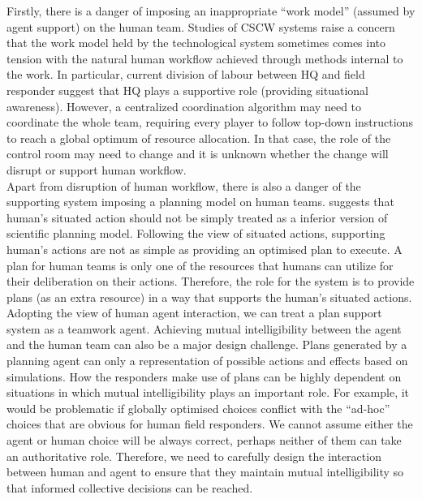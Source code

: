 Firstly, there is a danger of imposing an inappropriate ``work model'' (assumed by agent support) on the human team. Studies of \ac{CSCW} systems \citep{Bowers1994} raise a concern that the work model held by the technological system sometimes comes into tension with the natural human workflow achieved through methods internal to the work. In particular, current division of labour between HQ and field responder suggest that HQ plays a supportive role (providing situational awareness). However, a centralized coordination algorithm may need to coordinate the whole team, requiring every player to follow top-down instructions to reach a global optimum of resource allocation. In that case, the role of the control room may need to change and it is unknown whether the change will disrupt or support human workflow. \\

Apart from disruption of human workflow, there is also a danger of the supporting system imposing a planning model on human teams. \cite{Suchman1987} suggests that human's situated action should not be simply treated as a inferior version of scientific planning model. Following the view of situated actions, supporting human's actions are not as simple as providing an optimised plan to execute. A plan for human teams is only one of the resources that humans can utilize for their deliberation on their actions. Therefore, the role for the system is to provide plans (as an extra resource) in a way that supports the human's situated actions. \\

Adopting the view of human agent interaction, we can treat a plan support system as a teamwork agent.  Achieving mutual intelligibility between the agent and the human team can also be a major design challenge. Plans generated by a planning agent can only a representation of possible actions and effects based on simulations. How the responders make use of plans can be highly dependent on situations in which mutual intelligibility plays an important role. For example, it would be problematic if globally optimised choices conflict with the ``ad-hoc'' choices that are obvious for human field responders. We cannot assume either the agent or human choice will be always correct, perhaps neither of them can take an authoritative role. Therefore, we need to carefully design the interaction between human and agent to ensure that they maintain mutual intelligibility so that informed collective decisions can be reached.  \\

